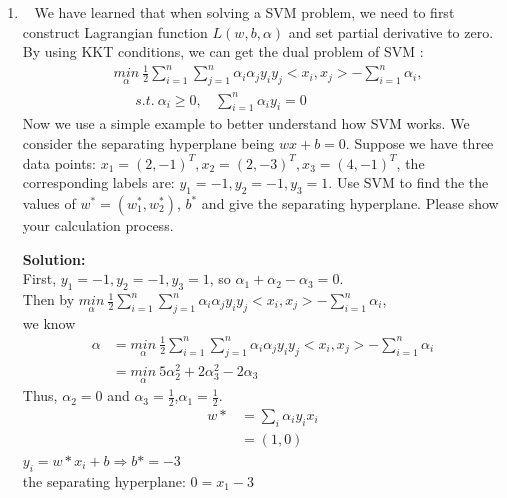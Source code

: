 \documentclass[10pt]{article}
\begin{document}
\begin{enumerate}
	\item ~ We have learned that when solving a SVM problem, we need to first construct Lagrangian function $L(w,b,\alpha)$ and set partial derivative to zero. By using KKT conditions, we can get the dual problem of SVM :
	      \begin{align*}
		       & \underset{\alpha}{min} \  \frac{1}{2}\sum\limits_{i=1}^{n}\sum\limits_{j=1}^{n}\alpha_i \alpha_j y_i y_j <x_i,x_j> - \sum\limits_{i=1}^{n}\alpha_i , \\ & \ \ \ \ \ \ \  s.t. \ \alpha_i \geq 0 , \ \ \ \ \sum\limits_{i=1}^{n}\alpha_i y_i = 0
	      \end{align*}
	      Now we use a simple example to better understand how SVM works. We consider the separating hyperplane being $wx + b = 0$. Suppose we have three data points: $x_1 = (2,-1)^T, x_2 = (2,-3)^T, x_3 = (4,-1)^T$, the corresponding labels are: $y_1 = -1, y_2 = -1, y_3 = 1$. Use SVM to find the the values of $w^* = (w_1^*, w_2^*)$, $b^*$ and give the separating hyperplane. Please show your calculation process.

\textbf{Solution:}
	\\First, $y_1 = -1, y_2 = -1, y_3 = 1$, so $\alpha_1+\alpha_2-\alpha_3=0$.
	\\Then by $\underset{\alpha}{min} \  \frac{1}{2}\sum\limits_{i=1}^{n}\sum\limits_{j=1}^{n}\alpha_i \alpha_j y_i y_j <x_i,x_j> - \sum\limits_{i=1}^{n}\alpha_i$,
		\\we know
			$$
				\begin{aligned}
					\alpha&=\underset{\alpha}{min} \  \frac{1}{2}\sum\limits_{i=1}^{n}\sum\limits_{j=1}^{n}\alpha_i \alpha_j y_i y_j <x_i,x_j> - \sum\limits_{i=1}^{n}\alpha_i
					\\&=\underset{\alpha}{min} \  5\alpha_2^2+2\alpha_3^2-2\alpha_3
				\end{aligned}
			$$ 
	Thus, $\alpha_2=0$ and $\alpha_3=\frac{1}{2}$,$\alpha_1=\frac{1}{2}$.
	$$
		\begin{aligned}
			w*&=\sum_i \alpha_i y_i x_i
			\\&=(1,0)
		\end{aligned}
	$$
	$y_i=w*x_i+b\Rightarrow b*=-3$
	\\the separating hyperplane: $0=x_1-3$
\end{enumerate}
\end{document}
